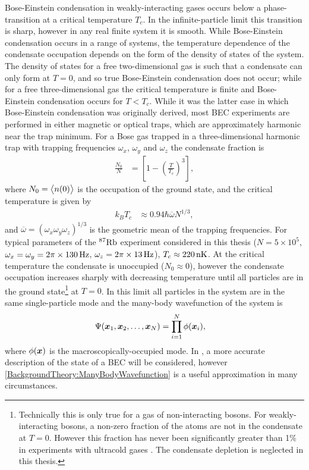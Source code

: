 Bose-Einstein condensation in weakly-interacting gases occurs below a phase-transition at a critical temperature $T_c$.  In the infinite-particle limit this transition is sharp, however in any real finite system it is smooth.  While Bose-Einstein condensation occurs in a range of systems, the temperature dependence of the condensate occupation depends on the form of the density of states of the system.  The density of states for a free two-dimensional gas is such that a condensate can only form at $T=0$, and so true Bose-Einstein condensation does not occur; while for a free three-dimensional gas the critical temperature is finite and Bose-Einstein condensation occurs for $T < T_c$.  While it was the latter case in which Bose-Einstein condensation was originally derived, most BEC experiments are performed in either magnetic or optical traps, which are approximately harmonic near the trap minimum.  For a Bose gas trapped in a three-dimensional harmonic trap with trapping frequencies $\omega_x$, $\omega_y$ and $\omega_z$ the condensate fraction is \citep{PethickSmith}
\begin{align}
    \frac{N_0}{N} &= \left[1 - \left(\frac{T}{T_c}\right)^{3} \right], \label{BackgroundTheory:CondensateFractionHarmonicTrap}
\end{align}
where $N_0 = {\big<n(0)\big>}$ is the occupation of the ground state, and the critical temperature is given by
\begin{align}
    k_B T_c &\approx 0.94 \hbar \overline{\omega} N^{1/3}, \label{BackgroundTheory:HarmonicTrapCriticalTemperature}
\end{align}
and $\overline{\omega}=(\omega_x \omega_y \omega_z)^{1/3}$ is the geometric mean of the trapping frequencies.  For typical parameters of the $^{87}\text{Rb}$ experiment considered in this thesis ($N = 5\times 10^5$, $\omega_x = \omega_y = 2 \pi \times \unit[130]{Hz}$, $\omega_z = 2 \pi \times \unit[13]{Hz}$), $T_c \approx \unit[220]{nK}$.  At the critical temperature the condensate is unoccupied ($N_0 \approx 0$), however the condensate occupation increases sharply with decreasing temperature until all particles are in the ground state\footnote{Technically this is only true for a gas of non-interacting bosons.  For weakly-interacting bosons, a non-zero fraction of the atoms are not in the condensate at $T=0$.  However this fraction has never been significantly greater than 1\% in experiments with ultracold gases \citep{Leggett:2001}.  The condensate depletion is neglected in this thesis.} at $T = 0$.  In this limit all particles in the system are in the same single-particle mode and the many-body wavefunction of the system is
\begin{align}
    \Psi(\vect{x}_1, \vect{x}_2, \dots, \vect{x}_N) &= \prod_{i=1}^{N} \phi(\vect{x}_i), \label{BackgroundTheory:ManyBodyWavefunction}
\end{align}
where $\phi(\bm{x})$ is the macroscopically-occupied mode.  In , a more accurate description of the state of a BEC will be considered, however \eqref{BackgroundTheory:ManyBodyWavefunction} is a useful approximation in many circumstances.

